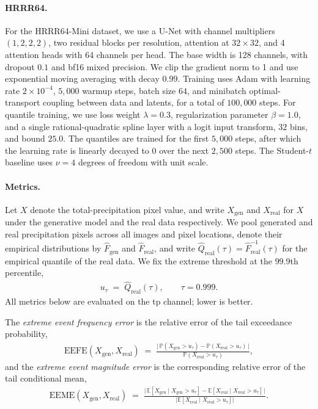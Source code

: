 \documentclass{article}
\theoremstyle{plain}
\theoremstyle{definition}
\theoremstyle{remark}
\begin{document}
\paragraph{HRRR64.}
  For the HRRR64-Mini dataset, we use a U-Net with channel
multipliers $(1,2,2,2)$, two residual blocks per resolution,
attention at $32\times32$, and 4 attention heads with 64 channels
per head. The base width is 128 channels, with dropout $0.1$ and
bf16 mixed precision. We clip the gradient norm to 1 and use
exponential moving averaging with decay $0.99$. Training uses
Adam with learning rate $2\times10^{-4}$, $5{,}000$ warmup steps,
batch size $64$, and minibatch optimal-transport coupling between
data and latents, for a total of $100{,}000$ steps. For quantile
training, we use loss weight $\lambda = 0.3$, regularization
parameter $\beta = 1.0$, and a single rational-quadratic spline
layer with a logit input transform, $32$ bins, and bound $25.0$.
The quantiles are trained for the first $5{,}000$ steps, after
which the learning rate is linearly decayed to $0$ over the next
$2{,}500$ steps. The Student-$t$ baseline uses $\nu = 4$ degrees
of freedom with unit scale.


\paragraph{Metrics.}
Let $X$ denote the total-precipitation pixel value, and write
$X_{\mathrm{gen}}$ and $X_{\mathrm{real}}$ for $X$ under the generative model
and the real data respectively. We pool generated and real precipitation
pixels across all images and pixel locations, denote their empirical
distributions by $\hat{F}_{\mathrm{gen}}$ and $\hat{F}_{\mathrm{real}}$, and
write $\hat{Q}_{\mathrm{real}}(\tau) = \hat{F}_{\mathrm{real}}^{-1}(\tau)$ for
the empirical quantile of the real data. We fix the extreme threshold at the
$99.9$th percentile,
\begin{align}
  u_\tau \;=\; \hat{Q}_{\mathrm{real}}(\tau), \qquad \tau = 0.999.
\end{align}
All metrics below are evaluated on the tp channel; lower is better.

The \textit{extreme event frequency error} is the relative error of the tail
exceedance probability,
\begin{align}
  \mathrm{EEFE}(X_{\mathrm{gen}}, X_{\mathrm{real}})
  \;=\;
  \frac{\bigl|\,\mathbb{P}(X_{\mathrm{gen}} > u_\tau)
              - \mathbb{P}(X_{\mathrm{real}} > u_\tau)\,\bigr|}
       {\mathbb{P}(X_{\mathrm{real}} > u_\tau)},
\end{align}
and the \textit{extreme event magnitude error} is the corresponding relative
error of the tail conditional mean,
\begin{align}
  \mathrm{EEME}(X_{\mathrm{gen}}, X_{\mathrm{real}})
  \;=\;
  \frac{\bigl|\,\mathbb{E}[X_{\mathrm{gen}} \mid X_{\mathrm{gen}} > u_\tau]
              - \mathbb{E}[X_{\mathrm{real}} \mid X_{\mathrm{real}} > u_\tau]\,\bigr|}
       {\bigl|\mathbb{E}[X_{\mathrm{real}} \mid X_{\mathrm{real}} > u_\tau]\bigr|}.
\end{align}
\end{document}

